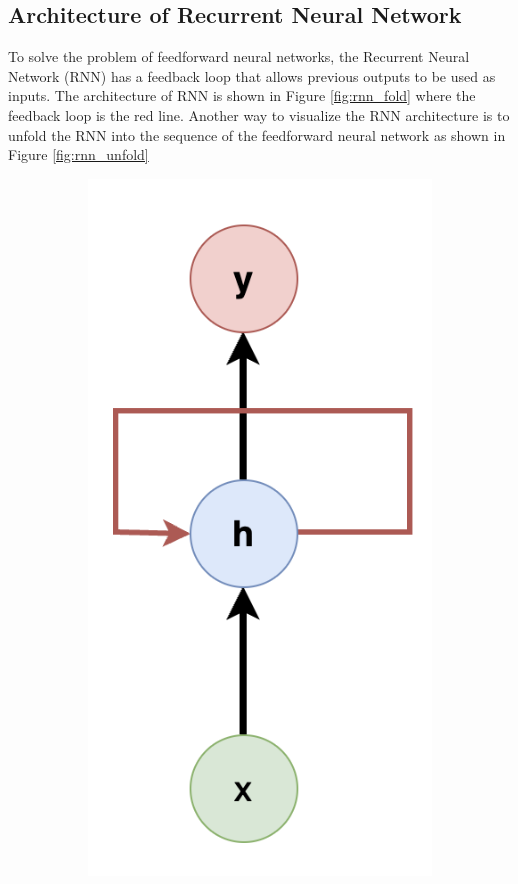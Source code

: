 \subsection{Architecture of Recurrent Neural Network}
To solve the problem of feedforward neural networks, the Recurrent Neural Network (RNN) has a feedback loop that allows previous outputs to be used as inputs. The architecture of RNN is shown in Figure \ref{fig:rnn_fold} where the feedback loop is the red line. Another way to visualize the RNN architecture is to unfold the RNN into the sequence of the feedforward neural network as shown in Figure \ref{fig:rnn_unfold}

\begin{figure}[ht]
    \centering
    \begin{subfigure}[b]{0.3\textwidth}
        \centering
        \includegraphics[height=0.25\textheight]{Images/5.Theoretical_Background/rnn_fold.png}

\end{subfigure}
\end{figure}
